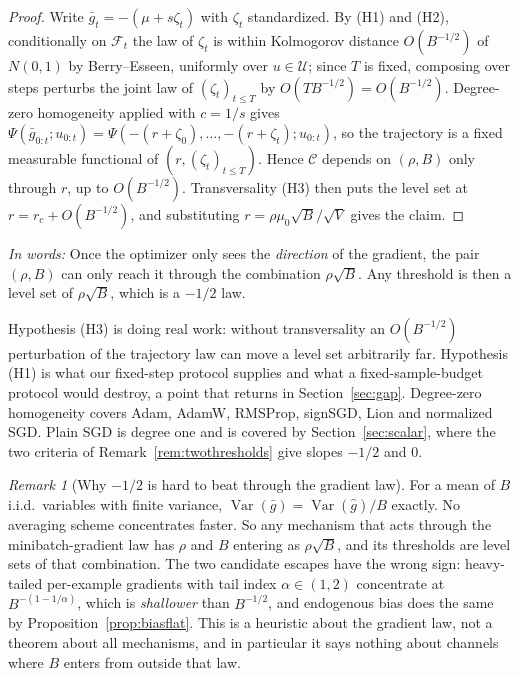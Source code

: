 \documentclass{article}
\theoremstyle{plain}
\theoremstyle{definition}
\theoremstyle{remark}
\newtheorem{remark}{Remark}
\newcommand{\Var}{\operatorname{Var}}
\newcommand{\1}{\mathbf{1}}
\newcommand{\cU}{\mathcal{U}}
\newcommand{\cF}{\mathcal{F}}
\newcommand{\takeaway}[1]{%
  \par\medskip\noindent\textit{In words:} #1\par\medskip}
\begin{document}
\begin{proof}
Write $\bar g_t = -(\mu+s\zeta_t)$ with $\zeta_t$ standardized. By (H1) and (H2),
conditionally on $\cF_t$ the law of $\zeta_t$ is within Kolmogorov distance
$O(B^{-1/2})$ of $N(0,1)$ by Berry--Esseen, uniformly over $u\in\cU$; since $T$
is fixed, composing over steps perturbs the joint law of $(\zeta_t)_{t\le T}$ by
$O(TB^{-1/2}) = O(B^{-1/2})$. Degree-zero homogeneity applied with $c = 1/s$
gives $\Psi(\bar g_{0:t};u_{0:t}) =
\Psi(-(r+\zeta_0),\dots,-(r+\zeta_t);u_{0:t})$, so the trajectory is a fixed
measurable functional of $(r,(\zeta_t)_{t\le T})$. Hence $\mathcal C$ depends on
$(\rho,B)$ only through $r$, up to $O(B^{-1/2})$. Transversality (H3) then puts
the level set at $r = r_c + O(B^{-1/2})$, and substituting
$r = \rho\mu_0\sqrt B/\sqrt V$ gives the claim.
\end{proof}

\takeaway{Once the optimizer only sees the \emph{direction} of the gradient, the
pair $(\rho,B)$ can only reach it through the combination $\rho\sqrt B$. Any
threshold is then a level set of $\rho\sqrt B$, which is a $-1/2$ law.}

Hypothesis (H3) is doing real work: without transversality an $O(B^{-1/2})$
perturbation of the trajectory law can move a level set arbitrarily far.
Hypothesis (H1) is what our fixed-step protocol supplies and what a
fixed-sample-budget protocol would destroy, a point that returns in
Section~\ref{sec:gap}. Degree-zero homogeneity covers Adam, AdamW, RMSProp,
signSGD, Lion and normalized SGD. Plain SGD is degree one and is covered by
Section~\ref{sec:scalar}, where the two criteria of
Remark~\ref{rem:twothresholds} give slopes $-1/2$ and $0$.

\begin{remark}[Why $-1/2$ is hard to beat through the gradient law]
\label{rem:hardfloor}
For a mean of $B$ i.i.d.\ variables with finite variance,
$\Var(\bar g) = \Var(\hat g)/B$ exactly. No averaging scheme concentrates faster.
So any mechanism that acts through the minibatch-gradient law has $\rho$ and $B$
entering as $\rho\sqrt B$, and its thresholds are level sets of that combination.
The two candidate escapes have the wrong sign: heavy-tailed per-example gradients
with tail index $\alpha\in(1,2)$ concentrate at $B^{-(1-1/\alpha)}$, which is
\emph{shallower} than $B^{-1/2}$, and endogenous bias does the same by
Proposition~\ref{prop:biasflat}. This is a heuristic about the gradient law, not
a theorem about all mechanisms, and in particular it says nothing about channels
where $B$ enters from outside that law.
\end{remark}
\end{document}
